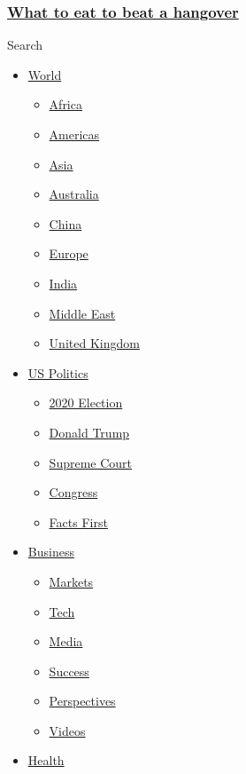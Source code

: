 \hypertarget{what-to-eat-to-beat-a-hangover}{%
\subsubsection{\texorpdfstring{\href{/2017/03/16/health/hangover-cure-foods-explainer/index.html}{What
to eat to beat a
hangover}}{What to eat to beat a hangover}}\label{what-to-eat-to-beat-a-hangover}}

Search

\begin{itemize}
\tightlist
\item
  \href{/world}{World}

  \begin{itemize}
  \tightlist
  \item
    \href{/africa}{Africa}
  \item
    \href{/americas}{Americas}
  \item
    \href{/asia}{Asia}
  \item
    \href{/australia}{Australia}
  \item
    \href{/china}{China}
  \item
    \href{/europe}{Europe}
  \item
    \href{/india}{India}
  \item
    \href{/middle-east}{Middle East}
  \item
    \href{/uk}{United Kingdom}
  \end{itemize}
\item
  \href{/politics}{US Politics}

  \begin{itemize}
  \tightlist
  \item
    \href{/election/2020}{2020 Election}
  \item
    \href{/specials/politics/president-donald-trump-45}{Donald Trump}
  \item
    \href{/specials/politics/supreme-court-nine}{Supreme Court}
  \item
    \href{/specials/politics/congress}{Congress}
  \item
    \href{/specials/politics/fact-check-politics}{Facts First}
  \end{itemize}
\item
  \href{/business}{Business}

  \begin{itemize}
  \tightlist
  \item
    \href{https://money.cnn.com/data/markets/}{Markets}
  \item
    \href{/business/tech}{Tech}
  \item
    \href{/business/media}{Media}
  \item
    \href{/business/success}{Success}
  \item
    \href{/business/perspectives}{Perspectives}
  \item
    \href{/business/videos}{Videos}
  \end{itemize}
\item
  \href{/health}{Health}


\end{itemize}
